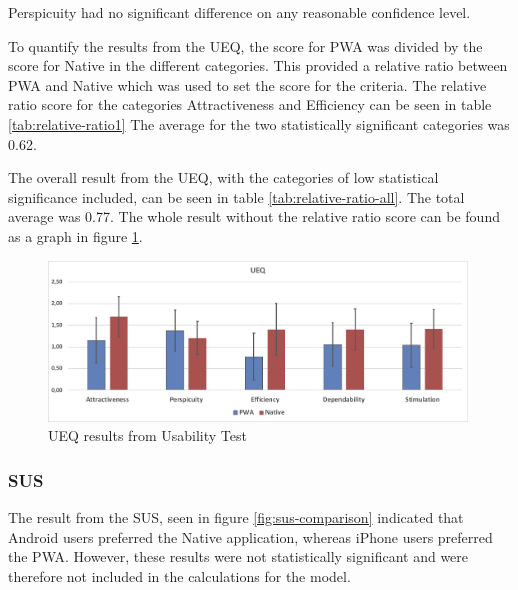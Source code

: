Perspicuity had no significant difference on any reasonable confidence level.

To quantify the results from the UEQ, the score for PWA was divided by the score for Native in the different categories. This provided a relative ratio between PWA and Native which was used to set the score for the criteria. The relative ratio score for the categories Attractiveness and Efficiency can be seen in table \ref{tab:relative-ratio1} The average for the two statistically significant categories was 0.62.



The overall result from the UEQ, with the categories of low statistical significance included, can be seen in table \ref{tab:relative-ratio-all}. The total average was 0.77. The whole result without the relative ratio score can be found as a graph in figure \ref{fig:ueq-result}.



\begin{figure}[ht]
    \centering 
    \includegraphics[width=0.99\textwidth]{img/UEQ_Result.png}
    \hfill
    \caption{\label{fig:ueq-result}{UEQ results from Usability Test}}
\end{figure}

\subsubsection{SUS}

The result from the SUS, seen in figure \ref{fig:sus-comparison} indicated that Android users preferred the Native application, whereas iPhone users preferred the PWA. However, these results were not statistically significant and were therefore not included in the calculations for the model.

